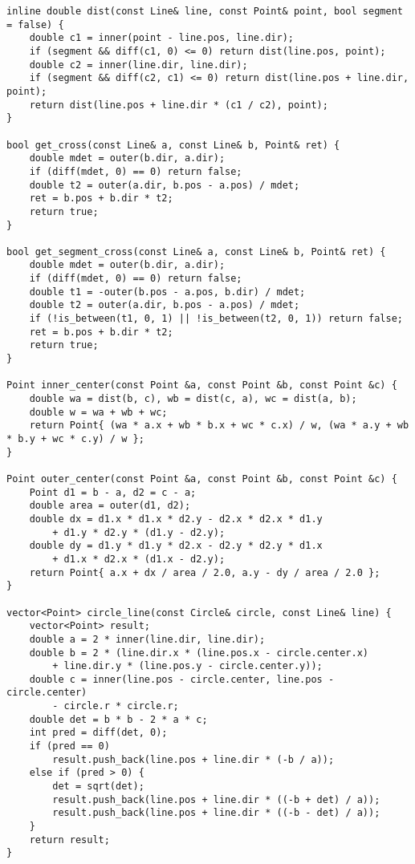 \documentclass[10pt, landscape]{article}
\begin{document}
\begin{multicols}{2}
\begin{verbatim}
inline double dist(const Line& line, const Point& point, bool segment = false) {
    double c1 = inner(point - line.pos, line.dir);
    if (segment && diff(c1, 0) <= 0) return dist(line.pos, point);
    double c2 = inner(line.dir, line.dir);
    if (segment && diff(c2, c1) <= 0) return dist(line.pos + line.dir, point);
    return dist(line.pos + line.dir * (c1 / c2), point);
}

bool get_cross(const Line& a, const Line& b, Point& ret) {
    double mdet = outer(b.dir, a.dir);
    if (diff(mdet, 0) == 0) return false;
    double t2 = outer(a.dir, b.pos - a.pos) / mdet;
    ret = b.pos + b.dir * t2;
    return true;
}

bool get_segment_cross(const Line& a, const Line& b, Point& ret) {
    double mdet = outer(b.dir, a.dir);
    if (diff(mdet, 0) == 0) return false;
    double t1 = -outer(b.pos - a.pos, b.dir) / mdet;
    double t2 = outer(a.dir, b.pos - a.pos) / mdet;
    if (!is_between(t1, 0, 1) || !is_between(t2, 0, 1)) return false;
    ret = b.pos + b.dir * t2;
    return true;
}

Point inner_center(const Point &a, const Point &b, const Point &c) {
    double wa = dist(b, c), wb = dist(c, a), wc = dist(a, b);
    double w = wa + wb + wc;
    return Point{ (wa * a.x + wb * b.x + wc * c.x) / w, (wa * a.y + wb * b.y + wc * c.y) / w };
}

Point outer_center(const Point &a, const Point &b, const Point &c) {
    Point d1 = b - a, d2 = c - a;
    double area = outer(d1, d2);
    double dx = d1.x * d1.x * d2.y - d2.x * d2.x * d1.y
        + d1.y * d2.y * (d1.y - d2.y);
    double dy = d1.y * d1.y * d2.x - d2.y * d2.y * d1.x
        + d1.x * d2.x * (d1.x - d2.y);
    return Point{ a.x + dx / area / 2.0, a.y - dy / area / 2.0 };
}

vector<Point> circle_line(const Circle& circle, const Line& line) {
    vector<Point> result;
    double a = 2 * inner(line.dir, line.dir);
    double b = 2 * (line.dir.x * (line.pos.x - circle.center.x)
        + line.dir.y * (line.pos.y - circle.center.y));
    double c = inner(line.pos - circle.center, line.pos - circle.center)
        - circle.r * circle.r;
    double det = b * b - 2 * a * c;
    int pred = diff(det, 0);
    if (pred == 0)
        result.push_back(line.pos + line.dir * (-b / a));
    else if (pred > 0) {
        det = sqrt(det);
        result.push_back(line.pos + line.dir * ((-b + det) / a));
        result.push_back(line.pos + line.dir * ((-b - det) / a));
    }
    return result;
}


\end{verbatim}
\end{multicols}
\end{document}
